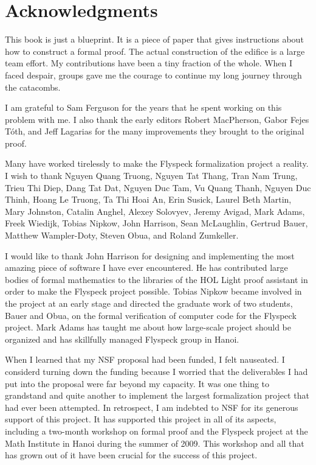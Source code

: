 

\section*{Acknowledgments}

This book is just a blueprint.  It is a piece of paper that gives instructions
about how to construct a formal proof.  The actual construction of the edifice
is a large team effort.  My contributions have been a tiny fraction of the whole.
When I faced despair, groups gave me the courage
to continue my long journey through the catacombs.

I am grateful to Sam Ferguson for the years that he spent working on
this problem with me.  I also thank the early editors Robert
MacPherson, Gabor Fejes T\'oth, and Jeff Lagarias for the many
improvements they brought to the original proof.

Many have worked tirelessly to make the Flyspeck formalization project
a reality.  I wish to thank Nguyen Quang
Truong, 
Nguyen Tat Thang, 
Tran Nam Trung, Trieu Thi Diep, Dang Tat Dat, Nguyen Duc Tam, Vu Quang
Thanh, Nguyen Duc Thinh, Hoang Le Truong, Ta Thi Hoai An, Erin Susick,
Laurel Beth Martin, Mary Johnston, Catalin Anghel, Alexey Solovyev, Jeremy Avigad, Mark
Adams, Freek Wiedijk, Tobias Nipkow, John Harrison, Sean McLaughlin,
Gertrud Bauer, Matthew Wampler-Doty, Steven Obua, and Roland
Zumkeller.

I would like to thank John Harrison for designing and implementing the
most amazing piece of software I have ever encountered.  He has
contributed large bodies of formal mathematics to the libraries of the
HOL Light proof assistant in order to make the Flyspeck project
possible.  Tobias Nipkow became involved in the project at an early
stage and directed the graduate work of two students, Bauer and Obua,
on the formal verification of computer code for the Flyspeck
project. Mark Adams has taught me about how large-scale project should
be organized and has skillfully managed Flyspeck group in Hanoi.

  When I learned that my NSF proposal had been funded, I felt
  nauseated.  I considerd turning down the
  funding because I worried that the  deliverables I had put
  into the proposal were far beyond my capacity.  It was one thing to
  grandstand and quite another to implement the largest
  formalization project that had ever been attempted.  In retrospect, I
  am indebted to NSF for its generous support of this project.  It has supported
  this project in all of its aspects, including a
  two-month  workshop on formal proof
  and the Flyspeck project  at the Math Institute in Hanoi during the summer of
  2009.  This workshop and all that has grown out of it have been crucial for
  the success of this project.

